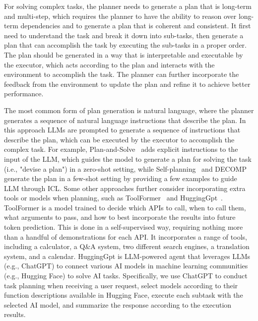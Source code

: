 For solving complex tasks, the planner needs to generate a plan that is long-term and multi-step, which requires the planner to have the ability to reason over long-term dependencies and to generate a plan that is coherent and consistent.
It first need to understand the task and break it down into sub-tasks, then generate a plan that can accomplish the task by executing the sub-tasks in a proper order.
The plan should be generated in a way that is interpretable and executable by the executor, which acts according to the plan and interacts with the environment to accomplish the task.
The planner can further incorporate the feedback from the environment to update the plan and refine it to achieve better performance.

The most common form of plan generation is natural language, where the planner generates a sequence of natural language instructions that describe the plan.
In this approach LLMs are prompted to generate a sequence of instructions that describe the plan, which can be executed by the executor to accomplish the complex task.
For example, Plan-and-Solve~\cite{wang2023plan} adds explicit instructions to the input of the LLM, which guides the model to generate a plan for solving the task (i.e., "devise a plan") in a zero-shot setting, while Self-planning~\cite{jiang2024selfplanning} and DECOMP~\cite{khot2022decomposed} generate the plan in a few-shot setting by providing a few examples to guide LLM through ICL\@.
Some other approaches further consider incorporating extra tools or models when planning, such as ToolFormer~\cite{schick2023toolformer} and HuggingGpt~\cite{shen2023hugginggpt}.
ToolFormer is a model trained to decide which APIs to call, when to call them, what arguments to pass, and how to best incorporate the results into future token prediction.
This is done in a self-supervised way, requiring nothing more than a handful of demonstrations for each API. It incorporates a range of tools, including a calculator, a Q\&A system, two different search engines, a translation system, and a calendar.
HuggingGpt is LLM-powered agent that leverages LLMs (e.g., ChatGPT) to connect various AI models in machine learning communities (e.g., Hugging Face) to solve AI tasks.
Specifically, we use ChatGPT to conduct task planning when receiving a user request, select models according to their function descriptions available in Hugging Face, execute each subtask with the selected AI model, and summarize the response according to the execution results.

